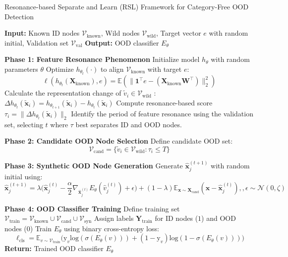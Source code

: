 \begin{algorithm}[H]
\caption{Resonance-based Separate and Learn (RSL) Framework for Category-Free OOD Detection}
\label{alg:RSL}
\begin{algorithmic}[1]
\STATE \textbf{Input:} Known ID nodes $\mathcal{V}_{\mathrm{known}}$, Wild nodes $\mathcal{V}_{\mathrm{wild}}$, Target vector $e$ with random initial, Validation set $\mathcal{V}_{\mathrm{val}}$
\STATE \textbf{Output:} OOD classifier $E_{\theta}$

\STATE \textbf{Phase 1: Feature Resonance Phenomenon}
\STATE Initialize model $h_{\theta}$ with random parameters $\theta$
    \STATE Optimize $h_{\theta_t}(\cdot)$ to align $\mathcal{V}_{\mathrm{known}}$ with target $e$:
    \[
    \ell(h_{\theta_t}({\boldsymbol X}_{\text{known}}), e) = \mathbb{E}(\parallel \mathbf{1}^\top e - ({\boldsymbol X}_{\text{known}}\mathbf{W}^\top) \parallel^2_2)
    \]
    \STATE Calculate the representation change of $\tilde{v}_i \in \mathcal{V}_{\mathrm{wild}}$ : $\Delta h_{\theta_t}(\tilde{\mathbf{x}}_i) = h_{\theta_{t+1}}(\tilde{\mathbf{x}}_i) - h_{\theta_t}(\tilde{\mathbf{x}}_i)$
    \STATE Compute resonance-based score $\tau_i = \parallel \Delta h_{\theta_t}(\tilde{\mathbf{x}}_i) \parallel_2$
\ENDFOR
\STATE Identify the period of feature resonance using the validation set, selecting $t$ where $\tau$ best separates ID and OOD nodes.

\STATE \textbf{Phase 2: Candidate OOD Node Selection}
\STATE Define candidate OOD set:
\[
\mathcal{V}_{\mathrm{cand}} = \{ \tilde{v}_i \in \mathcal{V}_{\mathrm{wild}} : \tau_i \leq T \}
\]

\STATE \textbf{Phase 3: Synthetic OOD Node Generation}
    \STATE Generate $\hat{\mathbf{x}}_j^{(t+1)}$ with random initial using:
    \[
    \hat{\mathbf{x}}_j^{(t+1)} = \lambda \big (\hat{\mathbf{x}}_j^{(t)} - \frac{\alpha}{2} \nabla_{\hat{\mathbf{x}}_j^{(t)}}E_{\theta}(\hat{v}_j^{(t)}) + \epsilon \big) + (1-\lambda)\mathbb{E}_{\mathbf{x} \sim \boldsymbol{X}_{\mathrm{cand}}}(\mathbf{x} - \hat{\mathbf{x}}_j^{(t)}), , \epsilon \sim \mathcal{N}(0, \zeta)
    \]
\ENDFOR

\STATE \textbf{Phase 4: OOD Classifier Training}
\STATE Define training set $\mathcal{V}_{\mathrm{train}} = \mathcal{V}_{\text{known}} \cup \mathcal{V}_{\mathrm{cand}} \cup \mathcal{V}_{\mathrm{syn}}$
\STATE Assign labels $\boldsymbol{Y}_{\mathrm{train}}$ for ID nodes ($1$) and OOD nodes ($0$)
\STATE Train $E_{\theta}$ using binary cross-entropy loss:
\[
\ell_{\text{cls}} = \mathbb{E}_{v \sim \mathcal{V}_{\mathrm{train}}}\big( \mathrm{y}_{v}\mathrm{log}(\sigma(E_{\theta}(v))) + (1-\mathrm{y}_{v})\mathrm{log}(1-\sigma(E_{\theta}(v))) \big)
\]
\STATE \textbf{Return:} Trained OOD classifier $E_{\theta}$
\end{algorithmic}
\end{algorithm}